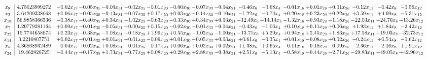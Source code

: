 \documentclass[9pt]{article}
\begin{document}
 \[\begin{array}{c| c c@{\hskip 2pt} c@{\hskip 2pt} c@{\hskip 2pt} c@{\hskip 2pt} c@{\hskip 2pt} c@{\hskip 2pt} c@{\hskip 2pt} c@{\hskip 2pt} c@{\hskip 2pt} c@{\hskip 2pt} c@{\hskip 2pt} c@{\hskip 2pt} c@{\hskip 2pt} c@{\hskip 2pt} c@{\hskip 2pt} c@{\hskip 2pt} }
 x_{9}   &  4.75023999272 & -0.02 x_{17} & -0.05 x_{35} & -0.00 x_{31} & -0.02 x_{25} & -0.01 x_{20} & -0.00 x_{30} & -0.07 x_{33} & -0.04 x_{21} & -0.46 x_{6} & -0.68 x_{4} & -0.01 x_{18} & +  0.01 x_{29} & +  0.01 x_{26} & -0.12 x_{11} & -0.42 x_{8} & -0.56 x_{12}\\
 x_{2}   &  3.64209338668 & +  0.06 x_{17} & -0.05 x_{35} & -0.13 x_{31} & +  0.07 x_{25} & +  0.17 x_{20} & +  0.03 x_{30} & -0.14 x_{33} & -0.10 x_{21} & -1.22 x_{6} & -0.74 x_{4} & +  0.20 x_{18} & +  0.23 x_{29} & +  0.22 x_{26} & +  3.59 x_{11} & +  4.09 x_{8} & -5.31 x_{12}\\
 x_{19}   &  56.9858366536 & -0.38 x_{17} & -0.40 x_{35} & +  0.34 x_{31} & -1.02 x_{25} & -0.63 x_{20} & -0.33 x_{30} & +  0.34 x_{33} & +  0.03 x_{21} & -12.49 x_{6} & -14.14 x_{4} & -1.32 x_{18} & -0.93 x_{29} & -1.18 x_{26} & -22.03 x_{11} & -24.70 x_{8} & + 13.26 x_{12}\\
 x_{7}   &  1.20779281164 & +  0.09 x_{17} & -0.01 x_{35} & -0.05 x_{31} & +  0.00 x_{25} & +  0.15 x_{20} & -0.02 x_{30} & -0.01 x_{33} & -0.04 x_{21} & -0.43 x_{6} & -1.06 x_{4} & +  0.10 x_{18} & +  0.11 x_{29} & +  0.06 x_{26} & +  1.93 x_{11} & +  1.84 x_{8} & -2.42 x_{12}\\
 x_{22}   &  15.7744658674 & +  0.23 x_{17} & -0.38 x_{35} & -1.08 x_{31} & +  0.18 x_{25} & +  1.99 x_{20} & +  0.55 x_{30} & -1.02 x_{33} & -1.00 x_{21} & -13.71 x_{6} & +  5.29 x_{4} & +  0.94 x_{18} & +  2.45 x_{29} & +  1.83 x_{26} & + 17.58 x_{11} & + 19.03 x_{8} & -32.73 x_{12}\\
 x_{14}   &  3.2210807751 & +  0.02 x_{17} & -0.01 x_{35} & +  0.01 x_{31} & +  0.01 x_{25} & -0.09 x_{20} & +  0.01 x_{30} & -0.05 x_{33} & +  0.03 x_{21} & +  0.61 x_{6} & -0.35 x_{4} & +  0.01 x_{18} & -0.08 x_{29} & +  0.02 x_{26} & -0.24 x_{11} & +  0.54 x_{8} & -0.62 x_{12}\\
 x_{5}   &  4.36868932489 & -0.04 x_{17} & +  0.02 x_{35} & +  0.08 x_{31} & -0.01 x_{25} & -0.17 x_{20} & +  0.06 x_{30} & +  0.02 x_{33} & +  0.02 x_{21} & +  1.38 x_{6} & +  0.65 x_{4} & -0.11 x_{18} & -0.18 x_{29} & -0.09 x_{26} & -2.36 x_{11} & -2.16 x_{8} & +  1.91 x_{12}\\
 x_{24}   &  19.462826725 & -0.44 x_{17} & +  0.17 x_{35} & +  1.73 x_{31} & -0.77 x_{25} & +  0.08 x_{20} & +  0.29 x_{30} & +  2.88 x_{33} & -0.38 x_{21} & +  2.51 x_{6} & -5.13 x_{4} & -0.58 x_{18} & -0.44 x_{29} & -2.71 x_{26} & -29.83 x_{11} & -49.05 x_{8} & + 42.96 x_{12}\\

\end{array}\]
\end{document}
